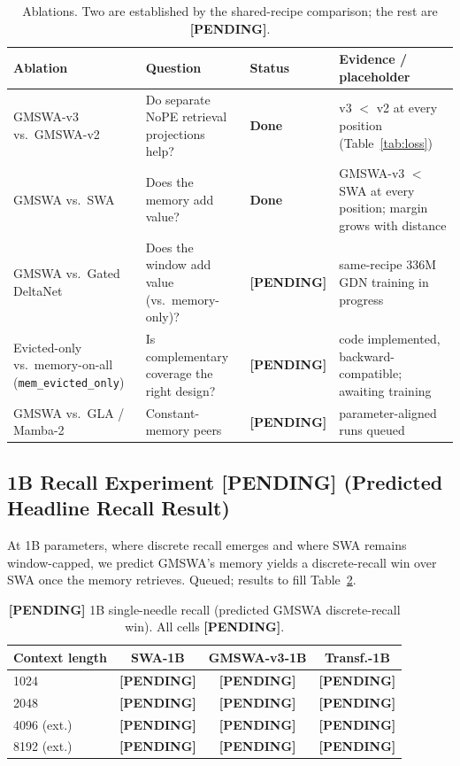 \documentclass[letterpaper]{article} %
\newcommand{\pending}{\textbf{[PENDING]}}
\begin{document}
\begin{table}[t]
\centering
\caption{Ablations. Two are established by the shared-recipe comparison; the rest are \pending{}.}
\label{tab:ablation}
\small
\setlength{\tabcolsep}{4pt}
\begin{tabular}{p{3.2cm}p{5.0cm}p{1.3cm}p{6.0cm}}
\toprule
Ablation & Question & Status & Evidence / placeholder \\
\midrule
GMSWA-v3 vs.\ GMSWA-v2 & Do separate NoPE retrieval projections help? & \textbf{Done} & v3 $<$ v2 at every position (Table~\ref{tab:loss}) \\
GMSWA vs.\ SWA & Does the memory add value? & \textbf{Done} & GMSWA-v3 $<$ SWA at every position; margin grows with distance \\
GMSWA vs.\ Gated DeltaNet & Does the window add value (vs.\ memory-only)? & \pending{} & same-recipe 336M GDN training in progress \\
Evicted-only vs.\ memory-on-all (\texttt{mem\_evicted\_only}) & Is complementary coverage the right design? & \pending{} & code implemented, backward-compatible; awaiting training \\
GMSWA vs.\ GLA / Mamba-2 & Constant-memory peers & \pending{} & parameter-aligned runs queued \\
\bottomrule
\end{tabular}
\end{table}

\subsection{1B Recall Experiment [PENDING] (Predicted Headline Recall Result)}
At 1B parameters, where discrete recall emerges and where SWA remains window-capped, we predict GMSWA's memory yields a discrete-recall win over SWA once the memory retrieves. Queued; results to fill Table~\ref{tab:onebrecall}.

\begin{table}[t]
\centering
\caption{\pending{} 1B single-needle recall (predicted GMSWA discrete-recall win). All cells \pending{}.}
\label{tab:onebrecall}
\small
\setlength{\tabcolsep}{4pt}
\begin{tabular}{lccc}
\toprule
Context length & SWA-1B & GMSWA-v3-1B & Transf.-1B \\
\midrule
1024        & \pending & \pending & \pending \\
2048        & \pending & \pending & \pending \\
4096 (ext.) & \pending & \pending & \pending \\
8192 (ext.) & \pending & \pending & \pending \\
\bottomrule
\end{tabular}
\end{table}
\end{document}
